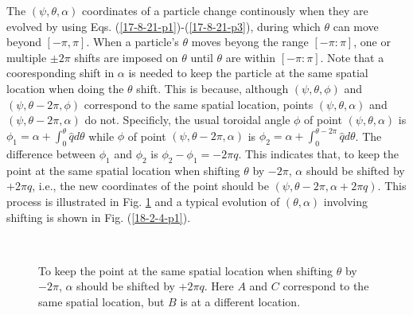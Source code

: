 \documentclass{article}
\begin{document}
The $(\psi, \theta, \alpha)$ coordinates of a particle change continously when
they are evolved by using Eqs. (\ref{17-8-21-p1})-(\ref{17-8-21-p3}), during
which $\theta$ can move beyond $[- \pi, \pi]$. When a particle's $\theta$
moves beyong the range $[- \pi : \pi]$, one or multiple $\pm 2 \pi$ shifts are
imposed on $\theta$ until $\theta$ are within $[- \pi : \pi]$. Note that a
cooresponding shift in $\alpha$ is needed to keep the particle at the same
spatial location when doing the $\theta$ shift. This is because, although
$(\psi, \theta, \phi)$ and $(\psi, \theta - 2 \pi, \phi)$ correspond to the
same spatial location, points $(\psi, \theta, \alpha)$ and $(\psi, \theta - 2
\pi, \alpha)$ do not. Specificly, the usual toroidal angle $\phi$ of point
$(\psi, \theta, \alpha)$ is $\phi_1 = \alpha + \int_0^{\theta} \hat{q} d
\theta$ while $\phi$ of point $(\psi, \theta - 2 \pi, \alpha)$ is $\phi_2 =
\alpha + \int_0^{\theta - 2 \pi} \hat{q} d \theta$. The difference between
$\phi_1$ and $\phi_2$ is $\phi_2 - \phi_1 = - 2 \pi q$. This indicates that,
to keep the point at the same spatial location when shifting $\theta$ by $- 2
\pi$, $\alpha$ should be shifted by $+ 2 \pi q$, i.e., the new coordinates of
the point should be $(\psi, \theta - 2 \pi, \alpha + 2 \pi q)$. This process
is illustrated in Fig. \ref{17-11-4-1} and a typical evolution of $(\theta,
\alpha)$ involving shifting is shown in Fig. (\ref{18-2-4-p1}).

\

\begin{figure}[h]
  \caption{\label{17-11-4-1}To keep the point at the same spatial location
  when shifting $\theta$ by $- 2 \pi$, $\alpha$ should be shifted by $+ 2 \pi
  q$. Here $A$ and $C$ correspond to the same spatial location, but $B$ is at
  a different location.}
\end{figure}

\

\
\end{document}
